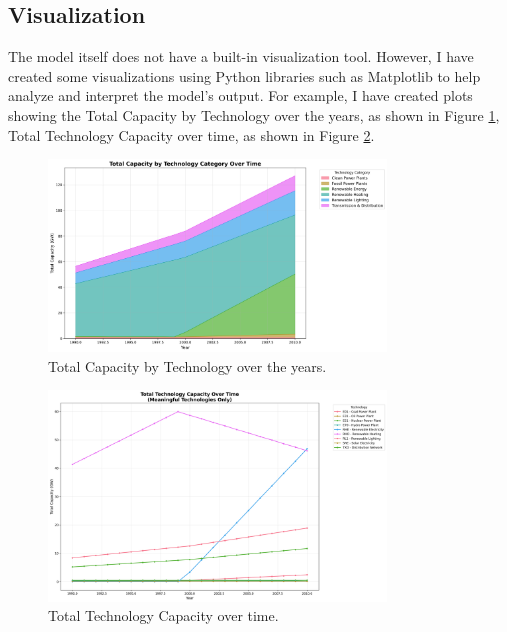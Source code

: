 \documentclass[11pt]{article}
\begin{document}
\subsection{Visualization}
The model itself does not have a built-in visualization tool. However, I have created some visualizations using Python libraries such as Matplotlib to help analyze and interpret the model's output. For example, I have created plots showing the Total Capacity by Technology over the years, as shown in Figure \ref{fig:total_capacity}, Total Technology Capacity over time, as shown in Figure \ref{fig:total_technology_capacity}.
\begin{figure}[H]
    \centering
    \includegraphics[width=0.8\textwidth]{visualizations/capacity_by_category_labeled.png}
    \caption{Total Capacity by Technology over the years.}
    \label{fig:total_capacity}
\end{figure}

\begin{figure}[H]
    \centering
    \includegraphics[width=0.8\textwidth]{visualizations/meaningful_total_capacity_labeled.png}
    \caption{Total Technology Capacity over time.}
    \label{fig:total_technology_capacity}
\end{figure}
\end{document}
